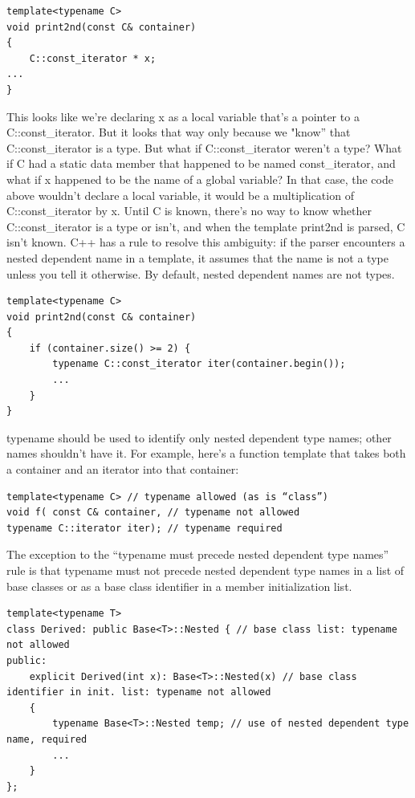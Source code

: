 \documentclass[a4paper,12pt,notitlepage]{article}
\begin{document}
\begin{verbatim}
template<typename C>
void print2nd(const C& container)
{
    C::const_iterator * x;
...
}
\end{verbatim}

This looks like we're declaring x as a local variable that's a pointer to a C::const\_iterator. But it looks 
that way only because we "know” that C::const\_iterator is a type. But what if C::const\_iterator weren't a 
type? What if C had a static data member that happened to be named const\_iterator, and what if x happened to 
be the name of a global variable? In that case, the code above wouldn't declare a local variable, it
would be a multiplication of C::const\_iterator by x. Until C is known, there's no way to know whether C::const\_iterator is a type or isn't, and when the template print2nd is parsed, C isn't known.
C++ has a rule to resolve this ambiguity: if the parser encounters a nested dependent name in a template, it assumes that the name is not a type unless you tell it otherwise. By default, nested dependent names are not types.

\begin{verbatim}
template<typename C>
void print2nd(const C& container)
{
    if (container.size() >= 2) {
        typename C::const_iterator iter(container.begin());
        ...
    }
}
\end{verbatim}

\noindent
typename should be used to identify only nested dependent type names; other names shouldn't have it. For example, here's a function template that takes both a container and an iterator into that container:

\begin{verbatim}
template<typename C> // typename allowed (as is “class”)
void f( const C& container, // typename not allowed
typename C::iterator iter); // typename required
\end{verbatim}

The exception to the “typename must precede nested dependent type names” rule is that typename must not precede nested dependent type names in a list of base classes or as a base class identifier in a member initialization list.

\begin{verbatim}
template<typename T>
class Derived: public Base<T>::Nested { // base class list: typename not allowed
public:
    explicit Derived(int x): Base<T>::Nested(x) // base class identifier in init. list: typename not allowed
    {
        typename Base<T>::Nested temp; // use of nested dependent type name, required
        ...
    }
};
\end{verbatim}
\end{document}
